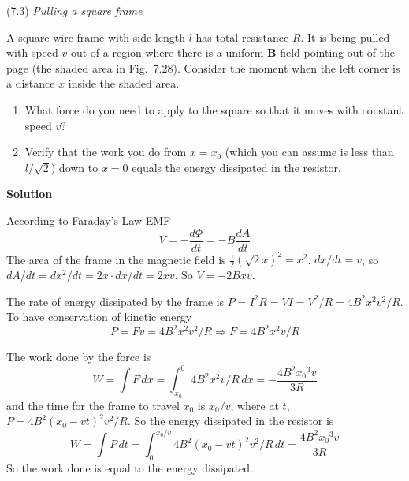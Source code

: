 \documentclass{article}
\begin{document}
\begin{homeworkProblem}
	(7.3) \textit{Pulling a square frame}

	A square wire frame with side length $l$ has total resistance $R$. It is being pulled with speed $v$ out of a region where there is a uniform $\mathbf{B}$ field pointing out of the page (the shaded area in Fig.~7.28). Consider the moment when the left corner is a distance $x$ inside the shaded area.
	\begin{enumerate}[label = (\alph*)]
		\item What force do you need to apply to the square so that it moves with constant speed $v$?
		\item Verify that the work you do from $x=x_0$ (which you can assume is less than $l/\sqrt{2}$) down to $x=0$ equals the energy dissipated in the resistor.
	\end{enumerate}

	\textbf{Solution}
	\begin{enumerate}[label = (\alph*)]
		\begin{item}
			According to Faraday's Law EMF
			\[
				V=-\frac{d\Phi}{dt}=-B\frac{dA}{dt}
			\]
			The area of the frame in the magnetic field is $\frac{1}{2}{\left(\sqrt{2}x\right)}^2=x^2$. $dx/dt=v$, so $dA/dt=dx^2/dt=2x\cdot dx/dt=2xv$. So $V=-2Bxv$.

			The rate of energy dissipated by the frame is $P=I^2R=VI=V^2/R=4B^2x^2v^2/R$. To have conservation of kinetic energy
			\[
				P=Fv=4B^2x^2v^2/R\Longrightarrow F=4B^2x^2v/R
			\]
		\end{item}
		\begin{item}
			The work done by the force is
			\[
				W=\int F\,dx=\int_{x_0}^0 4B^2x^2v/R\,dx=-\frac{4B^2{x_0}^3v}{3R}
			\]
			and the time for the frame to travel $x_0$ is $x_0/v$, where at $t$, $P=4B^2{(x_0-vt)}^2v^2/R$. So the energy dissipated in the resistor is
			\[
				W=\int P\,dt=\int_0^{x_0/v}4B^2{(x_0-vt)}^2v^2/R\,dt=\frac{4B^2{x_0}^3v}{3R}
			\]
			So the work done is equal to the energy dissipated.
		\end{item}
	\end{enumerate}
\end{homeworkProblem}

\end{document}

